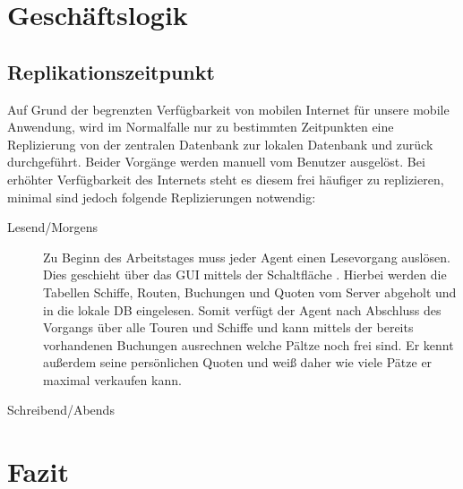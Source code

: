 \documentclass[12pt,a4paper,ngerman,english]{report}
\begin{document}
\chapter{Geschäftslogik}

\section{Replikationszeitpunkt}

Auf Grund der begrenzten Verfügbarkeit von mobilen Internet für unsere mobile Anwendung, wird im Normalfalle nur zu bestimmten Zeitpunkten eine Replizierung von der zentralen Datenbank zur lokalen Datenbank und zurück durchgeführt. Beider Vorgänge werden manuell vom Benutzer ausgelöst. Bei erhöhter Verfügbarkeit des Internets steht es diesem frei häufiger zu replizieren, minimal sind jedoch folgende Replizierungen notwendig:

\begin{description}
\item[Lesend/Morgens] Zu Beginn des Arbeitstages muss jeder Agent einen Lesevorgang auslösen. Dies geschieht über das GUI mittels der Schaltfläche . Hierbei werden die Tabellen Schiffe, Routen, Buchungen und Quoten  vom Server abgeholt und in die lokale DB eingelesen. Somit verfügt der Agent nach Abschluss des Vorgangs über alle Touren und Schiffe und kann mittels der bereits vorhandenen Buchungen ausrechnen welche Pältze noch frei sind. Er kennt außerdem seine persönlichen Quoten und weiß daher wie viele Pätze er maximal verkaufen kann.
\item[Schreibend/Abends] 
\end{description}

\chapter{Fazit}


{}

\end{document}

